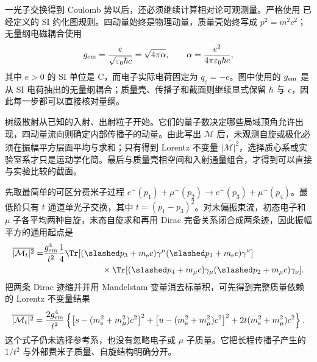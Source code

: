 

一光子交换得到 Coulomb 势以后，还必须继续计算相对论可观测量。严格使用
已经定义的 SI 约化图规则。四动量始终是物理动量，质量壳始终写成 $p^2=m^2c^2$；无量纲电磁耦合使用
\begin{equation}
 g_{\rm em}=\frac{e}{\sqrt{\varepsilon_0\hbar c}}=\sqrt{4\pi\alpha},
 \qquad
 \alpha=\frac{e^2}{4\pi\varepsilon_0\hbar c},
 \label{eq:alpha-si-qed-r10}
\end{equation}
其中 $e>0$ 的 SI 单位是 C，而电子实际电荷固定为 $q_{\mathrm e}=-e$。图中使用的 $g_{\rm em}$ 是从 SI 电荷抽出的无量纲耦合；质量壳、传播子和截面则继续显式保留 $\hbar$ 与 $c$，因此每一步都可以直接核对量纲。

树级散射从已知的入射、出射粒子开始。它们的量子数决定哪些局域顶角允许出现，四动量流向则确定内部传播子的动量。由此写出 $\mathcal M$ 后，未观测自旋或极化必须在振幅平方层面平均与求和；只有得到 Lorentz 不变量 $\overline{|\mathcal M|^2}$，选择质心系或实验室系才只是运动学化简。最后与质量壳相空间和入射通量组合，才得到可以直接与实验比较的截面。

先取最简单的可区分费米子过程
$e^-(p_1)+\mu^-(p_2)\to e^-(p_3)+\mu^-(p_4)$。最低阶只有 $t$ 通道单光子交换，其中 $t=(p_1-p_3)^2$。对未偏振束流，初态电子和 $\mu$ 子各平均两种自旋，末态自旋求和再用 Dirac 完备关系闭合成两条迹，因此振幅平方的通用起点是
\begin{align}
 \overline{|\mathcal M_t|^2}
 =&\frac{g_{\rm em}^4}{t^2}\frac14
 \Tr[(\slashed p_3+m_{\mathrm e} c)\gamma^\mu(\slashed p_1+m_{\mathrm e} c)\gamma^\nu]\nonumber\\
 &\hspace{2.4cm}\times
 \Tr[(\slashed p_4+m_\mu c)\gamma_\mu(\slashed p_2+m_\mu c)\gamma_\nu].
 \label{eq:emu-M2-trace}
\end{align}
把两条 Dirac 迹缩并并用 Mandelstam 变量消去标量积，可先得到完整质量依赖的 Lorentz 不变量结果
\begin{equation}
 {
 \overline{|\mathcal M_t|^2}
 =\frac{2g_{\rm em}^4}{t^2}
 \left\{
 \left[s-(m_{\mathrm e}^2+m_\mu^2)c^2\right]^2
 +\left[u-(m_{\mathrm e}^2+m_\mu^2)c^2\right]^2
 +2t(m_{\mathrm e}^2+m_\mu^2)c^2
 \right\}.}
 \label{eq:emu-M2-massive-invariants-dp49}
\end{equation}
这个式子仍未选择参考系，也没有忽略电子或 $\mu$ 子质量。它把长程传播子产生的 $1/t^2$ 与外部费米子质量、自旋结构明确分开。

